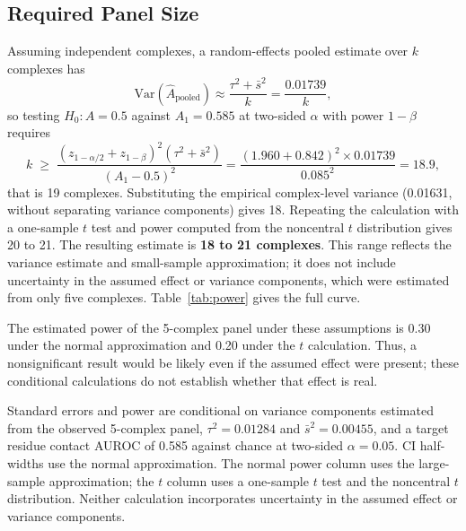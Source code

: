 \documentclass[11pt]{article}
\newenvironment{smalltable}%
{\begin{table}[!htbp]\centering\begingroup\setlength{\tabcolsep}{3pt}\renewcommand{\arraystretch}{1.1}\footnotesize}%
{\endgroup\end{table}}
\begin{document}
\subsection{Required Panel Size}
Assuming independent complexes, a random-effects pooled estimate over $k$ complexes has
\[
\mathrm{Var}(\hat{A}_{\text{pooled}}) \approx \frac{\tau^2 + \bar{s}^2}{k} = \frac{0.01739}{k},
\]
so testing $H_0: A = 0.5$ against $A_1 = 0.585$ at two-sided $\alpha$ with power $1 - \beta$ requires
\[
k \;\geq\; \frac{(z_{1 - \alpha/2} + z_{1 - \beta})^2 (\tau^2 + \bar{s}^2)}{(A_1 - 0.5)^2}
 = \frac{(1.960 + 0.842)^2 \times 0.01739}{0.085^2} = 18.9,
\]
that is 19 complexes. Substituting the empirical complex-level variance (0.01631, without separating variance components) gives 18. Repeating the calculation with a one-sample $t$ test and power computed from the noncentral $t$ distribution gives 20 to 21. The resulting estimate is \textbf{18 to 21 complexes}. This range reflects the variance estimate and small-sample approximation; it does not include uncertainty in the assumed effect or variance components, which were estimated from only five complexes. Table~\ref{tab:power} gives the full curve.

The estimated power of the 5-complex panel under these assumptions is 0.30 under the normal approximation and 0.20 under the $t$ calculation. Thus, a nonsignificant result would be likely even if the assumed effect were present; these conditional calculations do not establish whether that effect is real.

\begin{smalltable}
\caption{\textbf{Statistical power by number of protein--ligand complexes.}}
\label{tab:power}
\par\vspace{3pt}
\begin{minipage}{\linewidth}\footnotesize\raggedright
Standard errors and power are conditional on variance components estimated from the observed 5-complex panel, $\tau^2 = 0.01284$ and $\bar{s}^2 = 0.00455$, and a target residue contact AUROC of 0.585 against chance at two-sided $\alpha = 0.05$. CI half-widths use the normal approximation. The normal power column uses the large-sample approximation; the $t$ column uses a one-sample $t$ test and the noncentral $t$ distribution. Neither calculation incorporates uncertainty in the assumed effect or variance components.
\end{minipage}
\end{smalltable}
\end{document}
